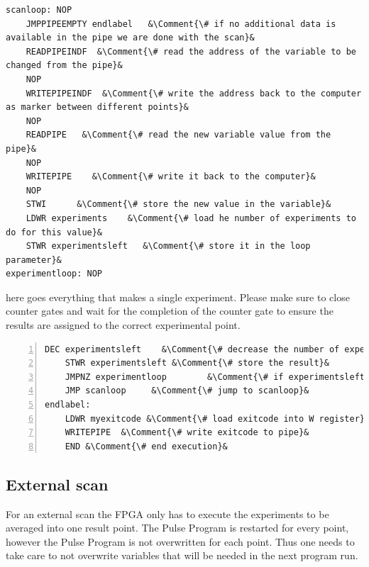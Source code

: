 \documentclass[11pt]{scrartcl}
\begin{document}
\begin{lstlisting}
scanloop: NOP
	JMPPIPEEMPTY endlabel   &\Comment{\# if no additional data is available in the pipe we are done with the scan}&
	READPIPEINDF  &\Comment{\# read the address of the variable to be changed from the pipe}&
	NOP
	WRITEPIPEINDF  &\Comment{\# write the address back to the computer as marker between different points}&
	NOP
	READPIPE   &\Comment{\# read the new variable value from the pipe}&
	NOP
	WRITEPIPE    &\Comment{\# write it back to the computer}&
	NOP
	STWI      &\Comment{\# store the new value in the variable}&
	LDWR experiments    &\Comment{\# load he number of experiments to do for this value}&
	STWR experimentsleft   &\Comment{\# store it in the loop parameter}&
experimentloop: NOP
\end{lstlisting}
 here goes everything that makes a single experiment. Please make sure to close counter gates and wait for the completion of the counter gate to ensure the results are assigned to the correct experimental point.

\begin{lstlisting}[numbers=left, firstnumber=last]
	DEC experimentsleft    &\Comment{\# decrease the number of experiments left to do, result is in W}&
	STWR experimentsleft &\Comment{\# store the result}&
	JMPNZ experimentloop        &\Comment{\# if experimentsleft>0 jump to experimentloop}&
	JMP scanloop     &\Comment{\# jump to scanloop}&
endlabel:
	LDWR myexitcode &\Comment{\# load exitcode into W register}&
	WRITEPIPE  &\Comment{\# write exitcode to pipe}&
	END &\Comment{\# end execution}&
\end{lstlisting}

\subsection{External scan}
For an external scan the FPGA only has to execute the experiments to be averaged into one result point. The Pulse Program is restarted for every point, however the Pulse Program is not overwritten for each point. Thus one needs to take care to not overwrite variables that will be needed in the next program run.
\end{document}
